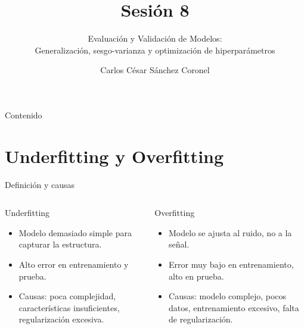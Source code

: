 \documentclass[aspectratio=169, 10pt, xcolor=table]{beamer}
\title[SESIÓN 8]{\textbf{Sesión 8}}
\subtitle{Evaluación y Validación de Modelos: \\ Generalización, sesgo-varianza y optimización de hiperparámetros}
\author[Prof. C. Sánchez]{Carlos César Sánchez Coronel}
\institute{\textbf{MACHINE LEARNING}}
\date{}
\begin{document}
\begin{frame}
    \titlepage
\end{frame}

\begin{frame}{Contenido}
    \tableofcontents
\end{frame}

\section{Underfitting y Overfitting}

\begin{frame}{Definición y causas}
    \begin{columns}[t]
        \begin{block}{Underfitting}
            \begin{itemize}
                \item Modelo demasiado simple para capturar la estructura.
                \item Alto error en entrenamiento y prueba.
                \item Causas: poca complejidad, características insuficientes, regularización excesiva.
            \end{itemize}
        \end{block}
        \begin{block}{Overfitting}
            \begin{itemize}
                \item Modelo se ajusta al ruido, no a la señal.
                \item Error muy bajo en entrenamiento, alto en prueba.
                \item Causas: modelo complejo, pocos datos, entrenamiento excesivo, falta de regularización.
            \end{itemize}
        \end{block}
    \end{columns}
\end{frame}
\end{document}
